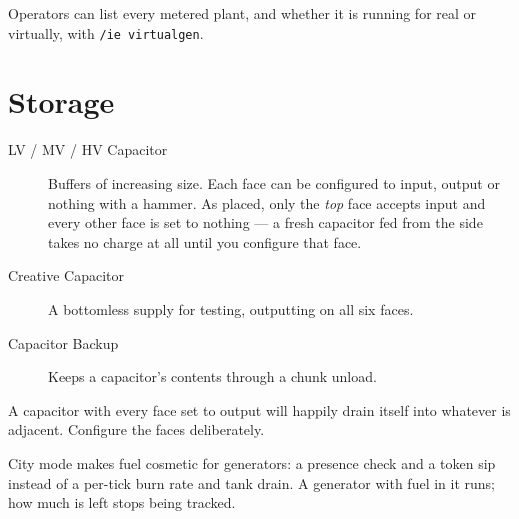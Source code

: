 \begin{ietip}
Operators can list every metered plant, and whether it is running for real or virtually, with
\texttt{/ie virtualgen}.
\end{ietip}

\section{Storage}

\begin{description}
\item[LV / MV / HV Capacitor] Buffers of increasing size. Each face can be configured to input,
      output or nothing with a hammer. As placed, only the \emph{top} face accepts input and every
      other face is set to nothing --- a fresh capacitor fed from the side takes no charge at all
      until you configure that face.
\item[Creative Capacitor] A bottomless supply for testing, outputting on all six faces.
\item[Capacitor Backup] Keeps a capacitor's contents through a chunk unload.
\end{description}

\begin{iewarning}
A capacitor with every face set to output will happily drain itself into whatever is adjacent.
Configure the faces deliberately.
\end{iewarning}

\begin{iefork}
City mode makes fuel cosmetic for generators: a presence check and a token sip instead of a per-tick
burn rate and tank drain. A generator with fuel in it runs; how much is left stops being tracked.
\end{iefork}
